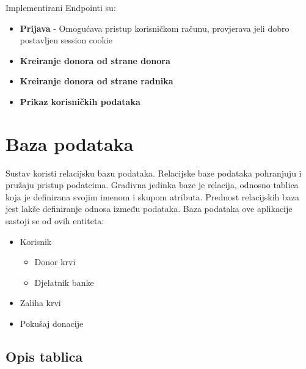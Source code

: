 	Implementirani Endpointi su:
	\begin{itemize}
	    \item {\textbf{Prijava} - Omogućava pristup korisničkom računu, provjerava jeli dobro postavljen session cookie}
	    \item {\textbf{Kreiranje donora od strane donora}}
	    \item {\textbf{Kreiranje donora od strane radnika}}
	    \item {\textbf{Prikaz korisničkih podataka}}
	\end{itemize}

	

	
		

		

				
		\section{Baza podataka}
			
			
		Sustav koristi relacijsku bazu podataka. Relacijske baze podataka pohranjuju i pružaju pristup podatcima. Gradivna jedinka baze je relacija, odnosno tablica koja je definirana svojim imenom i skupom atributa. Prednost relacijskih baza jest lakše definiranje odnosa između podataka. Baza podataka ove aplikacije sastoji se od ovih entiteta:
		\begin{itemize}
	        \item Korisnik
	        
	        \begin{itemize}
	            \item Donor krvi
	            \item Djelatnik banke
	        \end{itemize}
	        
	        \item Zaliha krvi
	        \item Pokušaj donacije
	        
	        
	    \end{itemize}
		
		
			\subsection{Opis tablica}
			

				
